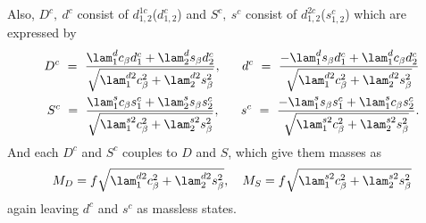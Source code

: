 Also, $D^c,~d^c$ consist of $d_{1,2}^{1c}$($d_{1,2}^c$) and $S^c,~s^c$ consist of $d_{1,2}^{2c}$($s_{1,2}^{c}$) which are expressed by
\begin{align}
 D^c~=~\frac{\lam_1^d c_\beta d_1^{c} + \lam_2^d s_\beta d_2^{c}}{\sqrt{\lam_1^{d2} c_\beta^2 + \lam_2^{d2} s_\beta^2}}, ~~~~~
 d^c~=~\frac{-\lam_1^d s_\beta d_1^{c} + \lam_1^d c_\beta d_2^{c}}{\sqrt{\lam_1^{d2} c_\beta^2 + \lam_2^{d2} s_\beta^2}} \nonumber\\
 S^c~=~\frac{\lam_1^s c_\beta s_1^{c} + \lam_2^s s_\beta s_2^{c}}{\sqrt{\lam_1^{s2} c_\beta^2 + \lam_2^{s2} s_\beta^2}}, ~~~~~
 s^c~=~\frac{-\lam_1^s s_\beta s_1^{c} + \lam_1^s c_\beta s_2^{c}}{\sqrt{\lam_1^{s2} c_\beta^2 + \lam_2^{s2} s_\beta^2}} .
\end{align}
And each $D^c$ and $S^c$ couples to $D$ and $S$, which give them masses as 
\begin{align}
 M_D=f\sqrt{\lam_1^{d2} c_\beta^2 + \lam_2^{d2} s_\beta^2},~~~M_S=f\sqrt{\lam_1^{s2} c_\beta^2 + \lam_2^{s2} s_\beta^2}
\end{align}
again leaving $d^c$ and $s^c$ as massless states.

